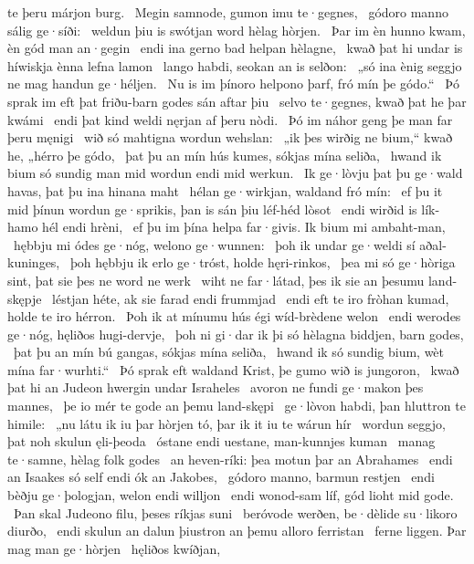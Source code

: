 te þeru márjon burg. \hld\ Megin samnode,
gumon imu te·gegnes, \hld\ gódoro manno
sálig ge·síði: \hld\ weldun þiu is swótjan word
hèlag hòrjen. \hld\ Þar im èn hunno kwam,
èn gód man an·gegin \hld\ endi ina gerno bad
helpan hèlagne, \hld\ kwað þat hi undar is híwiskja
ènna lefna lamon \hld\ lango habdi,
seokan an is selðon: \hld\ „só ina ènig seggjo ne mag
handun ge·héljen. \hld\ Nu is im þínoro helpono þarf,
fró mín þe gódo.“ \hld\ Þó sprak im eft þat friðu-barn godes
sán aftar þiu \hld\ selvo te·gegnes,
kwað þat he þar kwámi \hld\ endi þat kind weldi
nęrjan af þeru nòdi. \hld\ Þó im náhor geng
þe man far þeru męnigi \hld\ wið só mahtigna
wordun wehslan: \hld\ „ik þes wirðig ne bium,“ kwað he,
„hérro þe gódo, \hld\ þat þu an mín hús kumes,
sókjas mína seliða, \hld\ hwand ik bium só sundig man
mid wordun endi mid werkun. \hld\ Ik ge·lòvju þat þu ge·wald havas,
þat þu ina hinana maht \hld\ hélan ge·wirkjan,
waldand fró mín: \hld\ ef þu it mid þínun wordun ge·sprikis,
þan is sán þiu léf-héd lòsot \hld\ endi wirðid is lík-hamo
hél endi hrèni, \hld\ ef þu im þína helpa far·givis.
Ik bium mi ambaht-man, \hld\ hębbju mi ódes ge·nóg,
welono ge·wunnen: \hld\ þoh ik undar ge·weldi sí
aðal-kuninges, \hld\ þoh hębbju ik erlo ge·tróst,
holde hęri-rinkos, \hld\ þea mi só ge·hòriga sint,
þat sie þes ne word ne werk \hld\ wiht ne far·látad,
þes ik sie an þesumu land-skępje \hld\ léstjan héte,
ak sie farad endi frummjad \hld\ endi eft te iro fròhan kumad,
holde te iro hérron. \hld\ Þoh ik at mínumu hús égi
wíd-brèdene welon \hld\ endi werodes ge·nóg,
hęliðos hugi-dervje, \hld\ þoh ni gi·dar ik þi só hèlagna
biddjen, barn godes, \hld\ þat þu an mín bú gangas,
sókjas mína seliða, \hld\ hwand ik só sundig bium,
wèt mína far·wurhti.“ \hld\ Þó sprak eft waldand Krist,
þe gumo wið is jungoron, \hld\ kwað þat hi an Judeon hwergin
undar Israheles \hld\ avoron ne fundi
ge·makon þes mannes, \hld\ þe io mér te gode
an þemu land-skępi \hld\ ge·lòvon habdi,
þan hluttron te himile: \hld\ „nu látu ik iu þar hòrjen tó,
þar ik it iu te wárun hír \hld\ wordun seggjo,
þat noh skulun ęli-þeoda \hld\ óstane endi uestane,
man-kunnjes kuman \hld\ manag te·samne,
hèlag folk godes \hld\ an heven-ríki:
þea motun þar an Abrahames \hld\ endi an Isaakes só self
endi ók an Jakobes, \hld\ gódoro manno,
barmun restjen \hld\ endi bèðju ge·þologjan,
welon endi willjon \hld\ endi wonod-sam líf,
gód lioht mid gode. \hld\ Þan skal Judeono filu,
þeses ríkjas suni \hld\ beróvode werðen,
be·dèlide su·likoro diurðo, \hld\ endi skulun an dalun þiustron
an þemu alloro ferristan \hld\ ferne liggen.
Þar mag man ge·hòrjen \hld\ hęliðos kwíðjan,
